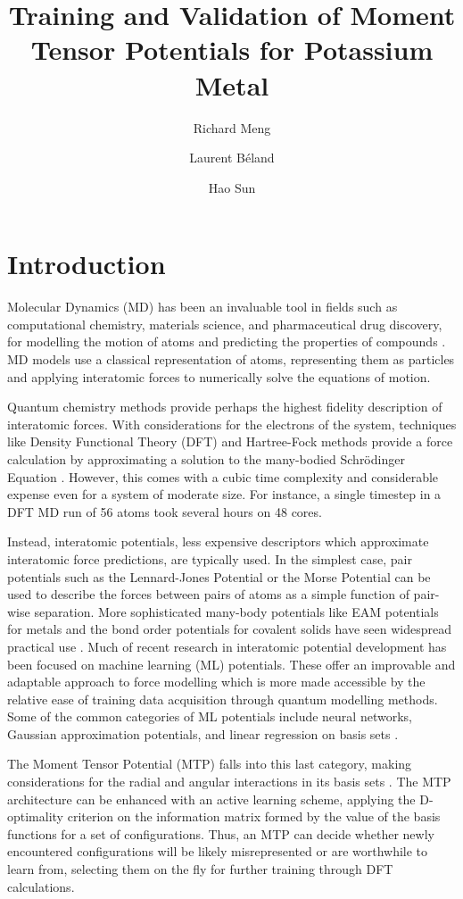 \documentclass[9pt,twocolumn,twoside]{opticajnl}
\title{Training and Validation of Moment Tensor Potentials for Potassium Metal}
\author[1,2,3]{ Richard Meng}
\author[1]{Laurent Béland}
\author[1]{Hao Sun}
\affil[1]{Department of Mechanical and Materials Engineering, Queen's University, 45 Union St, Kingston, ON K7L 3N6}
\affil[2]{contact@richardzjm.com}
\affil[3]{17zjm1@queensu.ca}
\begin{document}
\maketitle

\section{Introduction}
Molecular Dynamics (MD) has been an invaluable tool in fields such as computational chemistry, materials science, and pharmaceutical drug discovery, for modelling the motion of atoms and predicting the properties of compounds \cite{karplus2002molecular}. MD models use a classical representation of atoms, representing them as particles and applying interatomic forces to numerically solve the equations of motion.

Quantum chemistry methods provide perhaps the highest fidelity description of interatomic forces. With considerations for the electrons of the system, techniques like Density Functional Theory (DFT) and Hartree-Fock methods provide a force calculation by approximating a solution to the many-bodied Schrödinger Equation \cite{DFT}. However, this comes with a cubic time complexity and considerable expense even for a system of moderate size. For instance,  a single timestep in a DFT MD run of 56 atoms took several hours on 48 cores. 

Instead, interatomic potentials, less expensive descriptors which approximate interatomic force predictions, are typically used. In the simplest case, pair potentials such as the Lennard-Jones Potential or the Morse Potential can be used to describe the forces between pairs of atoms as a simple function of pair-wise separation. More sophisticated many-body potentials like EAM potentials for metals and the bond order potentials for covalent solids have seen widespread practical use \cite{MatSci}. Much of recent research in interatomic potential development has been focused on machine learning (ML) potentials. These offer an improvable and adaptable approach to force modelling which is more made accessible by the relative ease of training data acquisition through quantum modelling methods. Some of the common categories of ML potentials include neural networks, Gaussian approximation potentials, and linear regression on basis sets \cite{mlip}.

The Moment Tensor Potential (MTP) falls into this last category, making considerations for the radial and angular interactions in its basis sets \cite{mtp}. The MTP architecture can be enhanced with an active learning scheme, applying the D-optimality criterion on the information matrix formed by the value of the basis functions for a set of configurations. Thus, an MTP can decide whether newly encountered configurations will be likely misrepresented or are worthwhile to learn from, selecting them on the fly for further training through DFT calculations.
\end{document}
